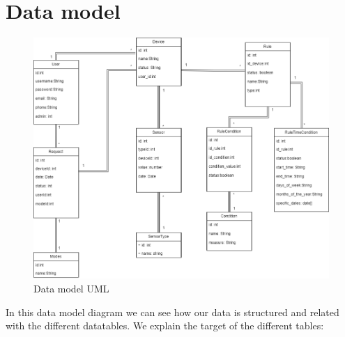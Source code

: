 \documentclass[11pt,a4paper]{article}
\begin{document}
\newpage

\section{Data model}
\begin{figure}[hbtp]
\centering
\includegraphics[scale=0.5]{ModelDeDades.png}
\caption{Data model UML}
\end{figure}
In this data model diagram we can see how our data is structured and related with the different datatables. We explain the target of the different tables:
\end{document}
